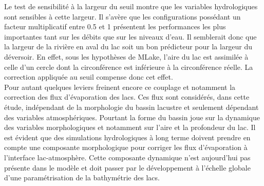 Le test de sensibilité à la largeur du seuil montre que les variables hydrologiques sont sensibles à cette largeur. Il s'avère que les configurations possédant un facteur multiplicatif entre 0.5 et 1 présentent les performances les plus importantes tant sur les débits que sur les niveaux d'eau. Il semblerait donc que la largeur de la rivière en aval du lac soit un bon prédicteur pour la largeur du déversoir. En effet, sous les hypothèses de MLake, l'aire du lac est assimilée à celle d'un cercle dont la circonférence est inférieure à la circonférence réelle. La correction appliquée au seuil compense donc cet effet.\\

Pour autant quelques leviers freinent encore ce couplage et notamment la correction des flux d'évaporation des lacs. Ces flux sont considérés, dans cette étude, indépendant de la morphologie du bassin lacustre et seulement dépendant des variables atmosphériques. Pourtant la forme du bassin joue sur la dynamique des variables morphologiques et notamment sur l'aire et la profondeur du lac. Il est évident que des simulations hydrologiques à long terme doivent prendre en compte une composante morphologique pour corriger les flux d'évaporation à l'interface lac-atmosphère. Cette composante dynamique n'est aujourd'hui pas présente dans le modèle et doit passer par le développement à l'échelle globale d'une paramétrisation de la bathymétrie des lacs. 
